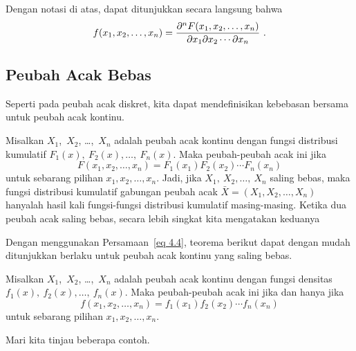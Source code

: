 Dengan notasi di atas, dapat ditunjukkan secara langsung bahwa
\begin{equation}
f(x_1, x_2, \ldots, x_n) = {{\partial^n F(x_1, x_2, \ldots, x_n)}\over
{\partial x_1 \partial x_2 \cdots \partial x_n}}\ .\label{eq 4.4}
\end{equation}

\subsection*{Peubah Acak Bebas}

Seperti pada peubah acak diskret, kita dapat mendefinisikan kebebasan bersama untuk
peubah acak kontinu.

\begin{definition}\label{def 4.6} Misalkan $X_1$,~$X_2$, \ldots,~$X_n$ adalah peubah acak
kontinu dengan fungsi distribusi kumulatif $F_1(x),~F_2(x), \ldots,~F_n(x)$.  Maka
peubah-peubah acak ini  jika
$$F(x_1, x_2, \ldots, x_n) = F_1(x_1)F_2(x_2) \cdots  F_n(x_n)$$   
untuk sebarang pilihan $x_1, x_2,
\ldots, x_n$.  Jadi, jika $X_1,~X_2, \ldots,~X_n$ saling bebas, maka fungsi distribusi
kumulatif gabungan peubah acak ${\bar X} = (X_1, X_2, \ldots,
X_n)$ hanyalah hasil kali fungsi-fungsi distribusi kumulatif masing-masing.  Ketika dua peubah
acak saling bebas, secara lebih singkat kita mengatakan keduanya 
\end{definition}

Dengan menggunakan Persamaan~\ref{eq 4.4}, teorema berikut dapat dengan mudah ditunjukkan berlaku untuk peubah acak
kontinu yang saling bebas.

\begin{theorem}\label{thm 4.2}
Misalkan $X_1$,~$X_2$, \ldots,~$X_n$ adalah peubah acak kontinu dengan fungsi densitas
$f_1(x),~f_2(x), \ldots,~f_n(x)$.  Maka peubah-peubah acak ini  jika dan hanya jika
$$f(x_1, x_2, \ldots, x_n) = f_1(x_1)f_2(x_2) \cdots  f_n(x_n)$$    untuk sebarang pilihan $x_1,
x_2, \ldots, x_n$.  
\end{theorem}

Mari kita tinjau beberapa contoh.

